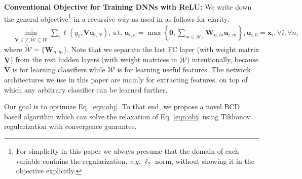 \documentclass{article}
\def\eg{\emph{e.g. }}
\begin{document}
    {\bf Conventional Objective for Training DNNs with ReLU:} We write down the general objective\footnote{For simplicity in this paper we always presume that the domain of each variable contains the regularization, \eg $\ell_2$-norm, without showing it in the objective explicitly.} in a recursive way as used in \cite{Zhang_2016_CVPR} as follows for clarity:	
	\begin{align}\label{eqn:obj}
	& \min_{\mathbf{V}\in\mathcal{V}, \tilde{\mathcal{W}}\subseteq\mathcal{W}} \sum_i\ell(y_i, \mathbf{V}\mathbf{u}_{i,N}), \, \mbox{s.t.} \; \mathbf{u}_{i,n} = \max\left\{\mathbf{0}, \sum_{m\in\mathcal{M}_n}\mathbf{W}_{n,m}\mathbf{u}_{i,m}\right\}, \mathbf{u}_{i,0}=\mathbf{x}_i, 
	\forall i, \forall n,
	\end{align}
	where $\tilde{\mathcal{W}}=\{\mathbf{W}_{n,m}\}$. Note that we separate the last FC layer (with weight matrix $\mathbf{V}$) from the rest hidden layers (with weight matrices in $\tilde{\mathcal{W}}$) intentionally, because $\mathbf{V}$ is for learning classifiers while $\tilde{\mathcal{W}}$ is for learning useful features. The network architectures we use in this paper are mainly for extracting features, on top of which any arbitrary classifier can be learned further.
    
    Our goal is to optimize Eq. \ref{eqn:obj}. To that end, we propose a novel BCD based algorithm which can solve the relaxation of Eq. \ref{eqn:obj} using Tikhonov regularization with convergence guarantee.
	
	
	
\end{document}
